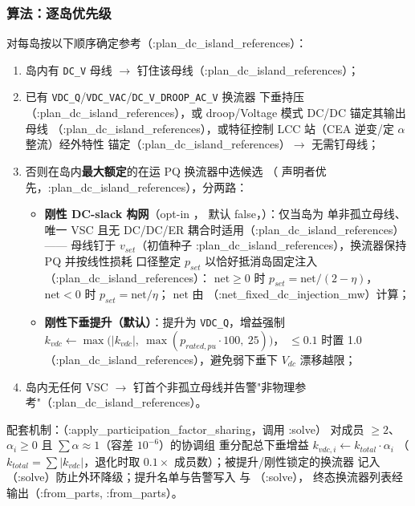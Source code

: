 \subsubsection*{算法：逐岛优先级}
对每岛按以下顺序确定参考（:plan\_dc\_island\_references）：
\begin{enumerate}
  \item 岛内有 \texttt{DC\_V} 母线 $\to$ 钉住该母线（:plan\_dc\_island\_references）；
  \item 已有 \texttt{VDC\_Q}/\texttt{VDC\_VAC}/\texttt{DC\_V\_DROOP\_AC\_V} 换流器
        下垂持压（:plan\_dc\_island\_references），或 droop/Voltage 模式 DC/DC 锚定其输出母线
        （:plan\_dc\_island\_references），或特征控制 LCC 站（CEA 逆变/定 $\alpha$ 整流）经外特性
        锚定（:plan\_dc\_island\_references）$\to$ 无需钉母线；
  \item 否则在岛内\textbf{最大额定}的在运 PQ 换流器中选候选
        （ 声明者优先，:plan\_dc\_island\_references），分两路：
        \begin{itemize}
          \item \textbf{刚性 DC-slack 构网}（opt-in ，
                默认 false，）：仅当岛为
                单非孤立母线、唯一 VSC 且无 DC/DC/ER 耦合时适用（:plan\_dc\_island\_references）——
                母线钉于 $v_{set}$（初值种子 :plan\_dc\_island\_references），换流器保持 PQ 并按线性损耗
                口径整定 $p_{set}$ 以恰好抵消岛固定注入（:plan\_dc\_island\_references）：
                $\mathrm{net}\ge0$ 时 $p_{set}=\mathrm{net}/(2-\eta)$，
                $\mathrm{net}<0$ 时 $p_{set}=\mathrm{net}/\eta$；
                $\mathrm{net}$ 由 （:net\_fixed\_dc\_injection\_mw）计算；
          \item \textbf{刚性下垂提升（默认）}：提升为 \texttt{VDC\_Q}，增益强制
                $k_{vdc}\leftarrow\max\big(|k_{vdc}|,\ \max(p_{rated,pu}\cdot100,\ 25)\big)$，
                $\le0.1$ 时置 1.0（:plan\_dc\_island\_references），避免弱下垂下
                $V_{dc}$ 漂移越限；
        \end{itemize}
  \item 岛内无任何 VSC $\to$ 钉首个非孤立母线并告警"非物理参考"（:plan\_dc\_island\_references）。
\end{enumerate}
配套机制：（:apply\_participation\_factor\_sharing，调用 :solve）
对成员 $\ge2$、$\alpha_i\ge0$ 且 $\sum\alpha\approx1$（容差 $10^{-6}$）的协调组
重分配总下垂增益 $k_{vdc,i}\leftarrow k_{total}\cdot\alpha_i$
（$k_{total}=\sum|k_{vdc}|$，退化时取 $0.1\times$ 成员数）；被提升/刚性锁定的换流器
记入 （:solve）防止外环降级；提升名单与告警写入
 与 （:solve），
终态换流器列表经  输出（:from\_parts, :from\_parts）。

